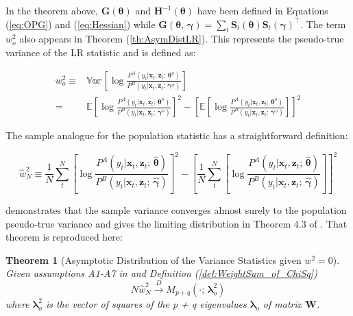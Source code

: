 \documentclass[12pt]{article}
\newcommand{\HI}[1]{\boldsymbol{H}^{-1}(#1)}
\theoremstyle{definition}
\newtheorem{theorem}{Theorem}[section]
\begin{document}
In the theorem above, $\boldsymbol{G}(\boldsymbol{\theta})$ and $\HI{\boldsymbol{\theta}}$ have been defined in Equations (\ref{eq:OPG}) and (\ref{eq:Hessian}) while $\boldsymbol{G}(\boldsymbol{\theta}, \, \boldsymbol{\gamma}) = \sum_{t} \boldsymbol{S}_{t}(\boldsymbol{\theta}) \boldsymbol{S}_{t}(\boldsymbol{\gamma})^\top$. The term $w^{2}_{o}$ also appears in Theorem (\ref{th:AsymDistLR}). This represents the pseudo-true variance of the LR statistic and is defined as:

\begin{align*}
  w_{o}^{2} \equiv & \mathbb{Var} \left[ \log \frac{ P^{A}(y_{t} | \boldsymbol{x}_{t}, \boldsymbol{z}_{t}; \, \boldsymbol{\theta}^{o}) }{ P^{B}(y_{t} | \boldsymbol{x}_{t}, \boldsymbol{z}_{t}; \, \boldsymbol{\gamma}^{o}) } \right] \\
   = & \mathbb{E} \left[ \log \frac{ P^{A}(y_{t} | \boldsymbol{x}_{t}, \boldsymbol{z}_{t}; \, \boldsymbol{\theta}^{o}) }{ P^{B}(y_{t} | \boldsymbol{x}_{t}, \boldsymbol{z}_{t}; \, \boldsymbol{\gamma}^{o}) } \right]^{2} - \left[ \mathbb{E} \left[ \log \frac{ P^{A}(y_{t} | \boldsymbol{x}_{t}, \boldsymbol{z}_{t}; \, \boldsymbol{\theta}^{o}) }{ P^{B}(y_{t} | \boldsymbol{x}_{t}, \boldsymbol{z}_{t}; \, \boldsymbol{\gamma}^{o}) } \right] \right]^{2}
\end{align*}

The sample analogue for the population statistic has a straightforward definition:

\begin{equation}
  \hat{w}^{2}_{N} \equiv \frac{1}{N} \sum_{t}^{N} \left[ \log \frac{ P^{A}(y_{t} | \boldsymbol{x}_{t}, \boldsymbol{z}_{t}; \, \hat{\boldsymbol{\theta}}) }{ P^{B}(y_{t} | \boldsymbol{x}_{t}, \boldsymbol{z}_{t}; \, \hat{\boldsymbol{\gamma}}) } \right]^{2} - \left[ \frac{1}{N} \sum_{t}^{N} \left[ \log \frac{ P^{A}(y_{t} | \boldsymbol{x}_{t}, \boldsymbol{z}_{t}; \, \hat{\boldsymbol{\theta}}) }{ P^{B}(y_{t} | \boldsymbol{x}_{t}, \boldsymbol{z}_{t}; \, \hat{\boldsymbol{\gamma}}) } \right] \right]^{2}
\end{equation}

\citet{Voung1989} demonstrates that the sample variance converges almost surely to the population pseudo-true variance and gives the limiting distribution in Theorem 4.3 of \citet{Voung1989}. That theorem is reproduced here:

\begin{theorem}[Asymptotic Distribution of the Variance Statistics given $w^{2} = 0$] \label{th:AsymDistVar_at_null}
  \emph{Given assumptions A1-A7 in \citet{Voung1989} and Definition (\ref{def:WeightSum_of_ChiSq})
  \begin{equation}
    N \hat{w}^{2}_{N} \overset{D}{\longrightarrow} M_{p+q}(\cdot; \, \boldsymbol{\lambda}^{2}_{o})
  \end{equation}
  where $\boldsymbol{\lambda}^{2}_{o}$ is the vector of squares of the p + q eigenvalues $\boldsymbol{\lambda}_{o}$ of matrix $\boldsymbol{W}$.}
\end{theorem}
\end{document}
